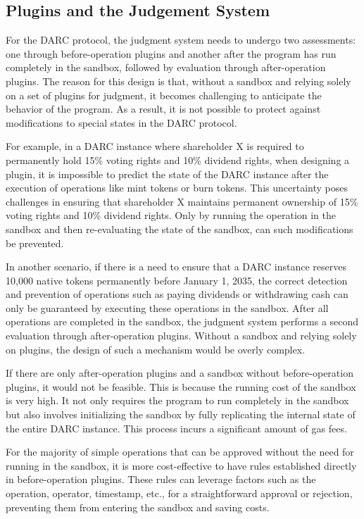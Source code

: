\documentclass[main.tex]{subfiles}
\begin{document}
\subsection{Plugins and the Judgement System}

For the DARC protocol, the judgment system needs to undergo two assessments: one through before-operation plugins and another after the program has run completely in the sandbox, followed by evaluation through after-operation plugins. The reason for this design is that, without a sandbox and relying solely on a set of plugins for judgment, it becomes challenging to anticipate the behavior of the program. As a result, it is not possible to protect against modifications to special states in the DARC protocol.

For example, in a DARC instance where shareholder X is required to permanently hold 15\% voting rights and 10\% dividend rights, when designing a plugin, it is impossible to predict the state of the DARC instance after the execution of operations like mint tokens or burn tokens. This uncertainty poses challenges in ensuring that shareholder X maintains permanent ownership of 15\% voting rights and 10\% dividend rights. Only by running the operation in the sandbox and then re-evaluating the state of the sandbox, can such modifications be prevented.

In another scenario, if there is a need to ensure that a DARC instance reserves 10,000 native tokens permanently before January 1, 2035, the correct detection and prevention of operations such as paying dividends or withdrawing cash can only be guaranteed by executing these operations in the sandbox. After all operations are completed in the sandbox, the judgment system performs a second evaluation through after-operation plugins. Without a sandbox and relying solely on plugins, the design of such a mechanism would be overly complex.


If there are only after-operation plugins and a sandbox without before-operation plugins, it would not be feasible. This is because the running cost of the sandbox is very high. It not only requires the program to run completely in the sandbox but also involves initializing the sandbox by fully replicating the internal state of the entire DARC instance. This process incurs a significant amount of gas fees.

For the majority of simple operations that can be approved without the need for running in the sandbox, it is more cost-effective to have rules established directly in before-operation plugins. These rules can leverage factors such as the operation, operator, timestamp, etc., for a straightforward approval or rejection, preventing them from entering the sandbox and saving costs.
\end{document}
